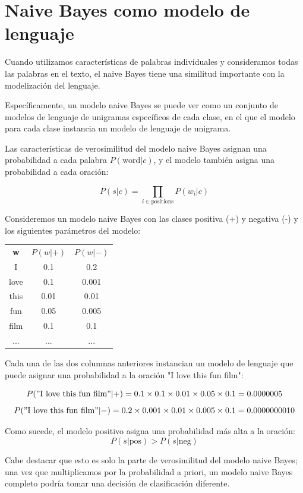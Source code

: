 \section{Naive Bayes como modelo de lenguaje}

Cuando utilizamos características de palabras individuales y consideramos todas las palabras en el texto, el naive Bayes tiene una similitud importante con la modelización del lenguaje.

Específicamente, un modelo naive Bayes se puede ver como un conjunto de modelos de lenguaje de unigramas específicos de cada clase, en el que el modelo para cada clase instancia un modelo de lenguaje de unigrama.

Las características de verosimilitud del modelo naive Bayes asignan una probabilidad a cada palabra $P(\text{word}|c)$, y el modelo también asigna una probabilidad a cada oración:

\[P(s|c) = \prod_{i\in \text{positions}} P(w_i|c)\]

Consideremos un modelo naive Bayes con las clases positiva (+) y negativa (-) y los siguientes parámetros del modelo:

\begin{center}
\begin{tabular}{ccc}
\textbf{w} & $P(w|+)$ & $P(w|-)$ \\
I & 0.1 & 0.2 \\
love & 0.1 & 0.001 \\
this & 0.01 & 0.01 \\
fun & 0.05 & 0.005 \\
film & 0.1 & 0.1 \\
... & ... & ...
\end{tabular}
\end{center}

Cada una de las dos columnas anteriores instancian un modelo de lenguaje que puede asignar una probabilidad a la oración "I love this fun film":

\[P("\text{I love this fun film}"|+) = 0.1 \times 0.1 \times 0.01 \times 0.05 \times 0.1 = 0.0000005\]
\[P("\text{I love this fun film}"|-) = 0.2 \times 0.001 \times 0.01 \times 0.005 \times 0.1 = 0.0000000010\]

Como sucede, el modelo positivo asigna una probabilidad más alta a la oración:
\[P(s|\text{pos}) > P(s|\text{neg})\]

Cabe destacar que esto es solo la parte de verosimilitud del modelo naive Bayes; una vez que multiplicamos por la probabilidad a priori, un modelo naive Bayes completo podría tomar una decisión de clasificación diferente.



